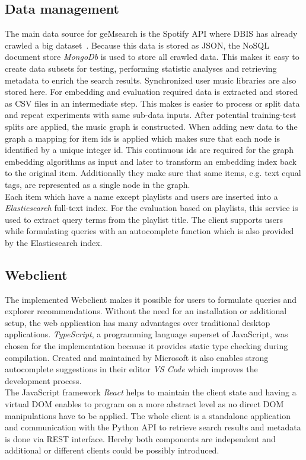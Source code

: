 \documentclass[sigconf]{acmart}
\begin{document}
\subsection{Data management}
The main data source for geMsearch is the Spotify API where DBIS has already crawled a big dataset~\cite{pichl2017improving}. Because this data is stored as JSON, the NoSQL document store \emph{MongoDb} is used to store all crawled data. This makes it easy to create data subsets for testing, performing statistic analyses and retrieving metadata to enrich the search results. Synchronized user music libraries are also stored here.
For embedding and evaluation required data is extracted and stored as CSV files in an intermediate step. This makes is easier to process or split data and repeat experiments with same sub-data inputs. After potential training-test splits are applied, the music graph is constructed. When adding new data to the graph a mapping for item ids is applied which makes sure that each node is identified by a unique integer id. This continuous ids are required for the graph embedding algorithms as input and later to transform an embedding index back to the original item. Additionally they make sure that same items, e.g. text equal tags, are represented as a single node in the graph. \\

Each item which have a name except playlists and users are inserted into a \emph{Elasticsearch} full-text index. For the evaluation based on playlists, this service is used to extract query terms from the playlist title. The client supports users while formulating queries with an autocomplete function which is also provided by the Elasticsearch index.

\subsection{Webclient}

The implemented Webclient makes it possible for users to formulate queries and explorer recommendations. Without the need for an installation or additional setup, the web application has many advantages over traditional desktop applications. \emph{TypeScript}, a programming language superset of JavaScript, was chosen for the implementation because it provides static type checking during compilation. Created and maintained by Microsoft it also enables strong autocomplete suggestions in their editor \emph{VS Code} which improves the development process. \\
The JavaScript framework \emph{React} helps to maintain the client state and having a virtual DOM enables to program on a more abstract level as no direct DOM manipulations have to be applied. The whole client is a standalone application and communication with the Python API to retrieve search results and metadata is done via REST interface. Hereby both components are independent and additional or different clients could be possibly introduced. \\
\end{document}
